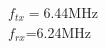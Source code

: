 \documentclass[preview]{standalone}
\begin{document}
\begin{center}
$f_{tx}=$6.44MHz\\$f_{rx}$=6.24MHz
\end{center}
\end{document}
